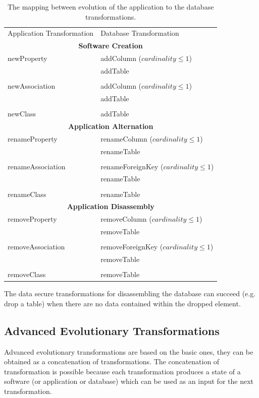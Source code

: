 \documentclass[11pt]{article}
\begin{document}
\begin{table}
\centering
	\begin{tabular}{|p{} p{}|}
	\hline
	Application Transformation & Database Transformation \\
	\multicolumn{2}{|c|}{\textbf{Software Creation}} \\
	newProperty & addColumn  ($cardinality \leq 1$)\\
	& addTable \\ 
	& \\
	newAssociation & addColumn ($cardinality \leq 1$)\\
	& addTable \\
	& \\
	newClass & addTable \\
	\multicolumn{2}{|c|}{\textbf{Application Alternation}} \\
	renameProperty & renameColumn ($cardinality \leq 1$)\\
	& renameTable \\
	& \\
	renameAssociation & renameForeignKey ($cardinality \leq 1$)\\
	& renameTable \\
	& \\
	renameClass & renameTable \\
	\multicolumn{2}{|c|}{\textbf{Application Disassembly}} \\
	removeProperty & removeColumn ($cardinality \leq 1$)\\
	& removeTable \\
	& \\
	removeAssociation & removeForeignKey ($cardinality \leq 1$)\\
	& removeTable \\
	& \\
	removeClass & removeTable\\
	\hline
	\end{tabular}
	\caption{The mapping between evolution of the application to the database transformations.}
	\label{tab:sw-basic-evolution}
\end{table}





The data secure transformations for disassembling the database can succeed (e.g. drop a table) when there are no data contained within the dropped element.


\subsection{Advanced Evolutionary Transformations}
\label{sec:sw-adv-evolution}
Advanced evolutionary transformations are based on the basic ones, they can be obtained as a concatenation of transformations. The concatenation of transformation is possible because each transformation produces a state of a software (or application or database) which can be used as an input for the next transformation. 
\end{document}
